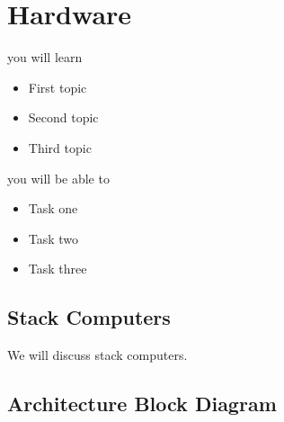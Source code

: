 \setchapterpreamble[u]{\margintoc}
\chapter{Hardware}

%
\begin{kaobox}[frametitle=In This Chapter]
you will learn
\begin{itemize}
	\item First topic
	\item Second topic
        \item Third topic
\end{itemize}

you will be able to
\begin{itemize}
        \item Task one
        \item Task two
        \item Task three
\end{itemize}
\end{kaobox}

\blindtext

%
\section{Stack Computers}
We will discuss stack computers.


%
\section{Architecture Block Diagram}

